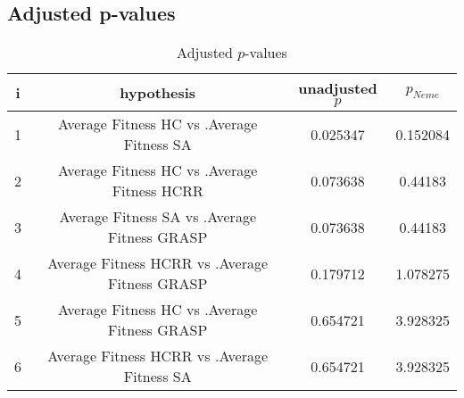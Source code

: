 \documentclass[a4paper,10pt]{article}
\begin{document}
\begin{landscape}
\pagebreak

\subsection{Adjusted p-values}

\begin{table}[!htp]
\centering\scriptsize
\begin{tabular}{cccc}
i&hypothesis&unadjusted $p$&$p_{Neme}$\\
\hline1&Average Fitness HC     vs .Average Fitness SA  &0.025347&0.152084\\
2&Average Fitness HC     vs .Average Fitness HCRR   &0.073638&0.44183\\
3&Average Fitness SA   vs .Average Fitness GRASP&0.073638&0.44183\\
4&Average Fitness HCRR    vs .Average Fitness GRASP&0.179712&1.078275\\
5&Average Fitness HC     vs .Average Fitness GRASP&0.654721&3.928325\\
6&Average Fitness HCRR    vs .Average Fitness SA  &0.654721&3.928325\\
\hline
\end{tabular}
\caption{Adjusted $p$-values}
\end{table}

\end{landscape}
\end{document}
